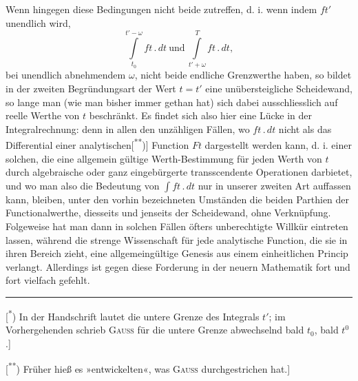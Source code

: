 Wenn hingegen diese Bedingungen nicht beide zutreffen, d. i. wenn indem \(ft'\) unendlich wird,
\[
\int\limits_{t_0}^{t'-\omega} ft\,{.}\,dt\ \text{und}\ \int\limits_{t'+\omega}^{T} ft\,{.}\,dt,
\]
\noindent bei unendlich abnehmendem \(\omega\), nicht beide endliche Grenzwerthe haben, so bildet in der zweiten Begründungsart der Wert \(t=t'\) eine unübersteigliche Scheidewand, so lange man (wie man bisher immer gethan hat) sich dabei ausschliesslich auf reelle Werthe von \(t\) beschränkt. Es findet sich also hier eine Lücke in der Integralrechnung: denn in allen den unzähligen Fällen, wo \(ft\,{.}\,dt\) nicht als das Differential einer analytischen[\textsuperscript{**})] Function \(Ft\) dargestellt werden kann, d. i. einer solchen, die eine allgemein gültige Werth-Bestimmung für jeden Werth von \(t\) durch algebraische oder ganz eingebürgerte transscendente Operationen darbietet, und wo man also die Bedeutung von \(\int ft\,{.}\,dt\) nur in unserer zweiten Art auffassen kann, bleiben, unter den vorhin bezeichneten Umständen die beiden Parthien der Functionalwerthe, diesseits und jenseits der Scheidewand, ohne Verknüpfung. Folgeweise hat man dann in solchen Fällen öfters unberechtigte Willkür eintreten lassen, während die strenge Wissenschaft für jede analytische Function, die sie in ihren Bereich zieht, eine allgemeingültige Genesis aus einem einheitlichen Princip verlangt. Allerdings ist gegen diese Forderung in der neuern Mathematik fort und fort vielfach gefehlt.
\par\vfill\noindent\rule{.25\linewidth}{.4pt}\par\smallskip
{\footnotesize
\noindent\hspace*{\parindent}[\textsuperscript{*}) In der Handschrift lautet die untere Grenze des Integrals \(t'\); im Vorhergehenden schrieb \textsc{Gauss} für die untere Grenze abwechselnd bald \(t_0\), bald \(t^0\).]\par
\noindent\hspace*{\parindent}[\textsuperscript{**}) Früher hieß es »entwickelten«, was \textsc{Gauss} durchgestrichen hat.]\par}
